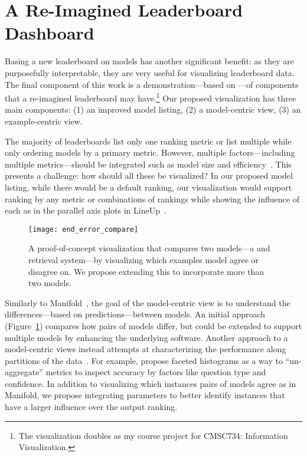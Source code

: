 \section{A Re-Imagined Leaderboard Dashboard}
\label{ch:isicle:vis}

Basing a new leaderboard on \irt{} models has another significant benefit: as they are purposefully interpretable, they are very useful for visualizing leaderboard data.
The final component of this work is a demonstration---based on \squad{}---of components that a re-imagined leaderboard may have.\footnote{
    The visualization doubles as my course project for CMSC734: Information Visualization.
}
Our proposed visualization has three main components: (1) an improved model listing, (2) a model-centric view, (3) an example-centric view.

The majority of leaderboards list only one ranking metric or list multiple while only ordering models by a primary metric.
However, multiple factors---including multiple metrics---should be integrated such as model size and efficiency~\citep{strubell2019energy}.
This presents a challenge: how should all these be visualized?
In our proposed model listing, while there would be a default ranking, our visualization would support ranking by any metric or combinations of rankings while showing the influence of each as in the parallel axis plots in LineUp~\citep{gratzl2013lineup}.

\begin{figure}[ht]
    \centering
    \texttt{[image: end\_error\_compare]}
    \caption{
        A proof-of-concept visualization that compares two models---a \bert{} and \ir{} retrieval system---by visualizing which examples model agree or disagree on.
        We propose extending this to incorporate more than two models.
    }
    \label{fig:pair}
\end{figure}

Similarly to Manifold~\citep{zhang2019manifold}, the goal of the model-centric view is to understand the differences---based on predictions---between models.
An initial approach (Figure~\ref{fig:pair}) compares how pairs of models differ, but could be extended to support multiple models by enhancing the underlying software.
Another approach to a model-centric views instead attempts at characterizing the performance along partitions of the data~\citep{liu2018answer}.
For example, \citet{arendt2020crosscheck} propose faceted histograms as a way to ``un-aggregate'' metrics to inspect \qa{} accuracy by factors like question type and confidence.
In addition to visualizing which instances pairs of models agree as in Manifold, we propose integrating \irt{} parameters to better identify instances that have a larger influence over the output ranking.

